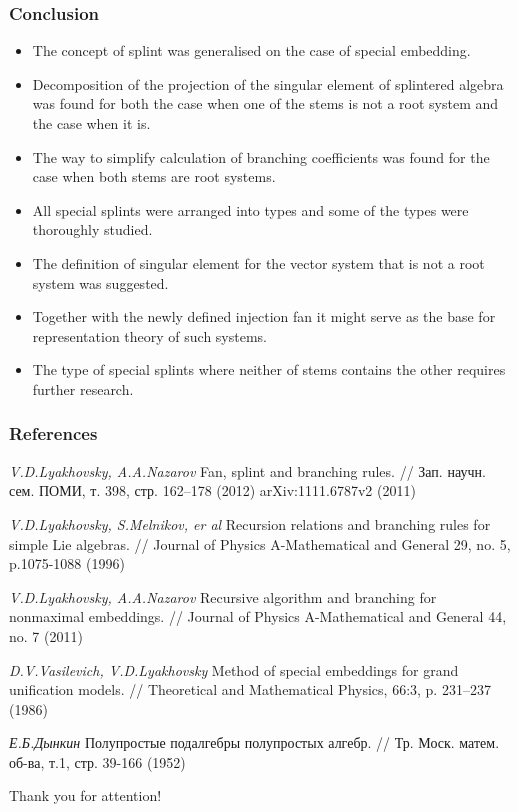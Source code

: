 \documentclass[pdftex]{beamer}
\theoremstyle{definition} \newtheorem{Def}{Definition}
\begin{document}
\begin{frame}
  \frametitle{Conclusion}
  \begin{itemize}
  \item The concept of splint was generalised on the case of special embedding.
  \item Decomposition of the projection of the singular element of splintered algebra was found for both the case when one of the stems is not a root system and the case when it is.
  \item The way to simplify calculation of branching coefficients was found for the case when both stems are root systems.
  \item All special splints were arranged into types and some of the types were thoroughly studied.
  \item The definition of singular element for the vector system that is not a root system was suggested.
  \item Together with the newly defined injection fan it might serve as the base for representation theory of such systems.
  \item The type of special splints where neither of stems contains the other requires further research.
  \end{itemize}

\end{frame}

\begin{frame}
  \frametitle{References}
  \begin{thebibliography}{99}

    {\it V.D.Lyakhovsky, A.A.Nazarov}
    Fan, splint and branching rules.
    // Зап. научн. сем. ПОМИ, т. 398, стр. 162–178 (2012)
    arXiv:1111.6787v2 (2011)

    {\it V.D.Lyakhovsky, S.Melnikov, er al}
    Recursion relations and branching rules for simple Lie algebras.
    // Journal of Physics A-Mathematical and General 29, no. 5, p.1075-1088 (1996)

    {\it V.D.Lyakhovsky, A.A.Nazarov}
    Recursive algorithm and branching for nonmaximal embeddings.
    // Journal of Physics A-Mathematical and General 44, no. 7 (2011)

    {\it D.V.Vasilevich, V.D.Lyakhovsky}
    Method of special embeddings for grand unification models.
    // Theoretical and Mathematical Physics, 66:3, p. 231–237 (1986)

    {\it Е.Б.Дынкин}
    Полупростые подалгебры полупростых алгебр.
    // Тр. Моск. матем. об-ва, т.1, стр. 39-166 (1952)

  \end{thebibliography}
\end{frame}

\begin{frame}[c]
  \begin{center}
    \Large{Thank you for attention!}    
  \end{center}



\end{frame}
\end{document}
